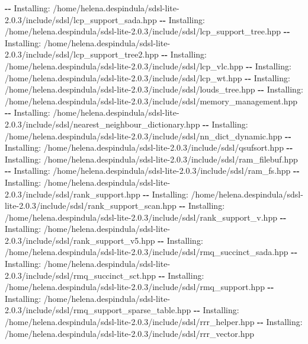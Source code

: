 \documentclass[
]{article}
\newenvironment{Shaded}{\begin{snugshade}}{\end{snugshade}}
\newcommand{\ExtensionTok}[1]{\textcolor[rgb]{0.00,0.60,1.00}{\textbf{#1}}}
\newcommand{\NormalTok}[1]{\textcolor[rgb]{0.81,0.81,0.76}{#1}}
\begin{document}
\begin{Shaded}
\begin{Highlighting}[]
\ExtensionTok{{-}{-}}\NormalTok{ Installing: /home/helena.despindula/sdsl{-}lite{-}2.0.3/include/sdsl/lcp\_support\_sada.hpp}
\ExtensionTok{{-}{-}}\NormalTok{ Installing: /home/helena.despindula/sdsl{-}lite{-}2.0.3/include/sdsl/lcp\_support\_tree.hpp}
\ExtensionTok{{-}{-}}\NormalTok{ Installing: /home/helena.despindula/sdsl{-}lite{-}2.0.3/include/sdsl/lcp\_support\_tree2.hpp}
\ExtensionTok{{-}{-}}\NormalTok{ Installing: /home/helena.despindula/sdsl{-}lite{-}2.0.3/include/sdsl/lcp\_vlc.hpp}
\ExtensionTok{{-}{-}}\NormalTok{ Installing: /home/helena.despindula/sdsl{-}lite{-}2.0.3/include/sdsl/lcp\_wt.hpp}
\ExtensionTok{{-}{-}}\NormalTok{ Installing: /home/helena.despindula/sdsl{-}lite{-}2.0.3/include/sdsl/louds\_tree.hpp}
\ExtensionTok{{-}{-}}\NormalTok{ Installing: /home/helena.despindula/sdsl{-}lite{-}2.0.3/include/sdsl/memory\_management.hpp}
\ExtensionTok{{-}{-}}\NormalTok{ Installing: /home/helena.despindula/sdsl{-}lite{-}2.0.3/include/sdsl/nearest\_neighbour\_dictionary.hpp}
\ExtensionTok{{-}{-}}\NormalTok{ Installing: /home/helena.despindula/sdsl{-}lite{-}2.0.3/include/sdsl/nn\_dict\_dynamic.hpp}
\ExtensionTok{{-}{-}}\NormalTok{ Installing: /home/helena.despindula/sdsl{-}lite{-}2.0.3/include/sdsl/qsufsort.hpp}
\ExtensionTok{{-}{-}}\NormalTok{ Installing: /home/helena.despindula/sdsl{-}lite{-}2.0.3/include/sdsl/ram\_filebuf.hpp}
\ExtensionTok{{-}{-}}\NormalTok{ Installing: /home/helena.despindula/sdsl{-}lite{-}2.0.3/include/sdsl/ram\_fs.hpp}
\ExtensionTok{{-}{-}}\NormalTok{ Installing: /home/helena.despindula/sdsl{-}lite{-}2.0.3/include/sdsl/rank\_support.hpp}
\ExtensionTok{{-}{-}}\NormalTok{ Installing: /home/helena.despindula/sdsl{-}lite{-}2.0.3/include/sdsl/rank\_support\_scan.hpp}
\ExtensionTok{{-}{-}}\NormalTok{ Installing: /home/helena.despindula/sdsl{-}lite{-}2.0.3/include/sdsl/rank\_support\_v.hpp}
\ExtensionTok{{-}{-}}\NormalTok{ Installing: /home/helena.despindula/sdsl{-}lite{-}2.0.3/include/sdsl/rank\_support\_v5.hpp}
\ExtensionTok{{-}{-}}\NormalTok{ Installing: /home/helena.despindula/sdsl{-}lite{-}2.0.3/include/sdsl/rmq\_succinct\_sada.hpp}
\ExtensionTok{{-}{-}}\NormalTok{ Installing: /home/helena.despindula/sdsl{-}lite{-}2.0.3/include/sdsl/rmq\_succinct\_sct.hpp}
\ExtensionTok{{-}{-}}\NormalTok{ Installing: /home/helena.despindula/sdsl{-}lite{-}2.0.3/include/sdsl/rmq\_support.hpp}
\ExtensionTok{{-}{-}}\NormalTok{ Installing: /home/helena.despindula/sdsl{-}lite{-}2.0.3/include/sdsl/rmq\_support\_sparse\_table.hpp}
\ExtensionTok{{-}{-}}\NormalTok{ Installing: /home/helena.despindula/sdsl{-}lite{-}2.0.3/include/sdsl/rrr\_helper.hpp}
\ExtensionTok{{-}{-}}\NormalTok{ Installing: /home/helena.despindula/sdsl{-}lite{-}2.0.3/include/sdsl/rrr\_vector.hpp}

\end{Highlighting}
\end{Shaded}
\end{document}
